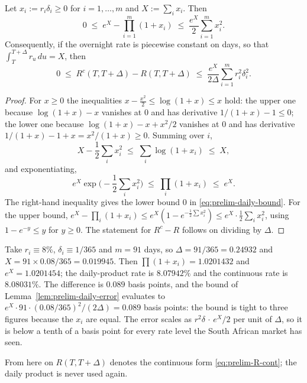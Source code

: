 \documentclass[../../../main.tex]{subfiles}
\begin{document}
\begin{lemma}\label{lem:prelim-daily-error}
Let $x_i:=r_i\delta_i\ge0$ for $i=1,\dots,m$ and $X:=\sum_i x_i$. Then
\begin{equation}\label{eq:prelim-daily-bound}
0\;\le\;e^{X}-\prod_{i=1}^{m}(1+x_i)\;\le\;\frac{e^{X}}{2}\sum_{i=1}^{m}x_i^2 .
\end{equation}
Consequently, if the overnight rate is piecewise constant on days, so that $\int_T^{T+\Delta}r_u\,du=X$, then
\[
0\;\le\;R^{c}(T,T+\Delta)-R(T,T+\Delta)\;\le\;\frac{e^{X}}{2\Delta}\sum_{i=1}^{m}r_i^2\delta_i^2 .
\]
\end{lemma}

\begin{proof}
For $x\ge0$ the inequalities $x-\tfrac{x^2}{2}\le\log(1+x)\le x$ hold: the upper one because $\log(1+x)-x$ vanishes at $0$ and has derivative $1/(1+x)-1\le0$; the lower one because $\log(1+x)-x+x^2/2$ vanishes at $0$ and has derivative $1/(1+x)-1+x=x^2/(1+x)\ge0$. Summing over $i$,
\[
X-\frac12\sum_i x_i^2\;\le\;\sum_i\log(1+x_i)\;\le\;X,
\]
and exponentiating,
\[
e^{X}\exp\Big(-\frac12\sum_i x_i^2\Big)\;\le\;\prod_i(1+x_i)\;\le\;e^{X}.
\]
The right-hand inequality gives the lower bound $0$ in \eqref{eq:prelim-daily-bound}. For the upper bound, $e^{X}-\prod_i(1+x_i)\le e^{X}(1-e^{-\frac12\sum x_i^2})\le e^{X}\cdot\frac12\sum_i x_i^2$, using $1-e^{-y}\le y$ for $y\ge0$. The statement for $R^{c}-R$ follows on dividing by $\Delta$.
\end{proof}

\begin{example}\label{ex:prelim-daily-error}
Take $r_i\equiv8\%$, $\delta_i\equiv1/365$ and $m=91$ days, so $\Delta=91/365=0.24932$ and $X=91\times0.08/365=0.019945$. Then $\prod(1+x_i)=1.0201432$ and $e^{X}=1.0201454$; the daily-product rate is $8.07942\%$ and the continuous rate is $8.08031\%$. The difference is $0.089$ basis points, and the bound of Lemma~\ref{lem:prelim-daily-error} evaluates to $e^{X}\cdot91\cdot(0.08/365)^2/(2\Delta)=0.089$ basis points: the bound is tight to three figures because the $x_i$ are equal. The error scales as $r^2\delta\,\cdot\,e^{X}/2$ per unit of $\Delta$, so it is below a tenth of a basis point for every rate level the South African market has seen.
\end{example}

From here on $R(T,T+\Delta)$ denotes the continuous form \eqref{eq:prelim-R-cont}; the daily product is never used again.
\end{document}
